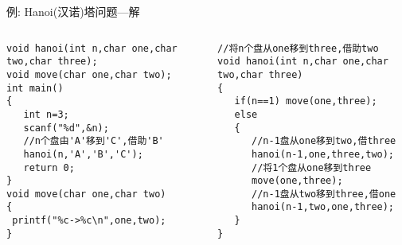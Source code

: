 \begin{frame}{例: Hanoi(汉诺)塔问题---解}
\begin{columns}[T]
\begin{lstlisting}
void hanoi(int n,char one,char two,char three);
void move(char one,char two);
int main()
{
   int n=3;
   scanf("%d",&n);
   //n个盘由'A'移到'C',借助'B'
   hanoi(n,'A','B','C');
   return 0;
}
void move(char one,char two)
{
 printf("%c->%c\n",one,two);
}
\end{lstlisting}
\begin{lstlisting}
//将n个盘从one移到three,借助two
void hanoi(int n,char one,char two,char three)
{
   if(n==1) move(one,three); 
   else
   {
      //n-1盘从one移到two,借three
      hanoi(n-1,one,three,two); 
      //将1个盘从one移到three
      move(one,three); 
      //n-1盘从two移到three,借one
      hanoi(n-1,two,one,three); 
   }
}
\end{lstlisting}
\end{columns}
~\\
\end{frame}


